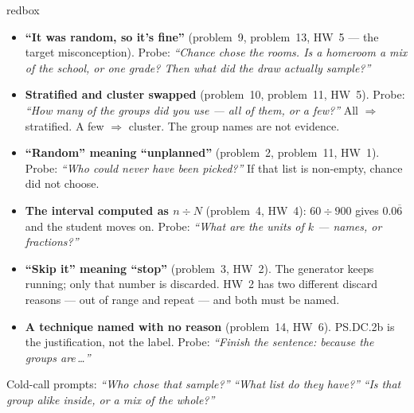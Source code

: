 \documentclass[10pt]{article}
\begin{document}
\boxguard
\begin{skillbox}{redbox}
\begin{itemize}[leftmargin=1.2em, nosep]
  \item \textbf{``It was random, so it's fine''} (problem~9, problem~13, HW~5 --- the target
        misconception). Probe: \emph{``Chance chose the rooms. Is a homeroom a mix of the
        school, or one grade? Then what did the draw actually sample?''}
  \item \textbf{Stratified and cluster swapped} (problem~10, problem~11, HW~5). Probe:
        \emph{``How many of the groups did you use --- all of them, or a few?''} All
        $\Rightarrow$ stratified. A few $\Rightarrow$ cluster. The group names are not evidence.
  \item \textbf{``Random'' meaning ``unplanned''} (problem~2, problem~11, HW~1).
        Probe: \emph{``Who could never have been picked?''} If that list is non-empty, chance
        did not choose.
  \item \textbf{The interval computed as $n \div N$} (problem~4, HW~4): $60 \div 900$ gives
        $0.0\overline{6}$ and the student moves on. Probe: \emph{``What are the units of $k$
        --- names, or fractions?''}
  \item \textbf{``Skip it'' meaning ``stop''} (problem~3, HW~2). The generator keeps
        running; only that number is discarded. HW~2 has two different discard reasons ---
        out of range and repeat --- and both must be named.
  \item \textbf{A technique named with no reason} (problem~14, HW~6). PS.DC.2b is the
        justification, not the label. Probe: \emph{``Finish the sentence: because the groups
        are\,\ldots''}
\end{itemize}
Cold-call prompts: \emph{``Who chose that sample?''} \quad \emph{``What list do they have?''}
\quad \emph{``Is that group alike inside, or a mix of the whole?''}
\end{skillbox}
\end{document}
